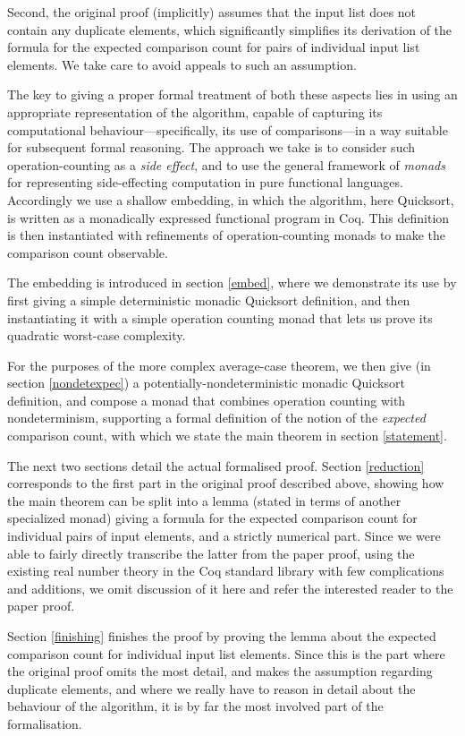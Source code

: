 \documentclass[runningheads]{llncs}
\begin{document}
Second, the original proof (implicitly) assumes that the input list does not contain any duplicate elements, which significantly simplifies its derivation of the formula for the expected comparison count for pairs of individual input list elements. We take care to avoid appeals to such an assumption.

The key to giving a proper formal treatment of both these aspects lies in using an appropriate representation of the algorithm, capable of capturing its computational behaviour---specifically, its use of comparisons---in a way suitable for subsequent formal reasoning. 
The approach we take is to consider such operation-counting as a \emph{side effect}, and to use the general framework of \emph{monads} for representing side-effecting computation in pure functional languages. 
Accordingly we use a shallow embedding, in which the algorithm, here Quicksort, is written as a monadically expressed functional program in Coq. This definition is then instantiated with refinements of operation-counting monads to make the comparison count observable.

The embedding is introduced in section \ref{embed}, where we demonstrate its use by first giving a simple deterministic monadic Quicksort definition, and then instantiating it with a simple operation counting monad that lets us prove its quadratic worst-case complexity.

For the purposes of the more complex average-case theorem, we then give (in section \ref{nondetexpec}) a potentially-nondeterministic monadic Quicksort definition, and compose a monad that combines operation counting with nondeterminism, supporting a formal definition of the notion of the \emph{expected} comparison count, with which we state the main theorem in section \ref{statement}.

The next two sections detail the actual formalised proof. Section \ref{reduction} corresponds to the first part in the original proof described above, showing how the main theorem can be split into a lemma (stated in terms of another specialized monad) giving a formula for the expected comparison count for individual pairs of input elements, and a strictly numerical part. Since we were able to fairly directly transcribe the latter from the paper proof, using the existing real number theory in the Coq standard library with few complications and additions, we omit discussion of it here and refer the interested reader to the paper proof.

Section \ref{finishing} finishes the proof by proving the lemma about the expected comparison count for individual input list elements. Since this is the part where the original proof omits the most detail, and makes the assumption regarding duplicate elements, and where we really have to reason in detail about the behaviour of the algorithm, it is by far the most involved part of the formalisation.
\end{document}
